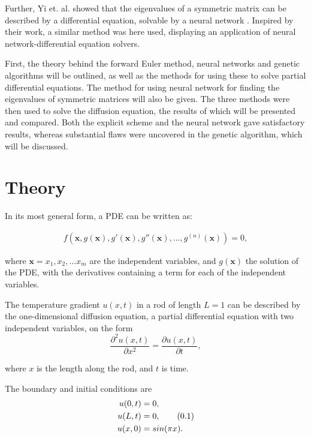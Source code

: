 \documentclass[multicolumn, 9pt]{extarticle}
\newcommand\numberthis{\addtocounter{equation}{1}\tag{\theequation}}
\begin{document}
Further, Yi et. al. showed that the eigenvalues of a symmetric matrix can be described by a differential equation, solvable by a neural network \cite{symmetric}. Inspired by their work, a similar method was here used, displaying an application of neural network-differential equation solvers.

First, the theory behind the forward Euler method, neural networks and genetic algorithms will be outlined, as well as the methods for using these to solve partial differential equations. The method for using neural network for finding the eigenvalues of symmetric matrices will also be given. The three methods were then used to solve the diffusion equation, the results of which will be presented and compared. Both the explicit scheme and the neural network gave satisfactory results, whereas substantial flaws were uncovered in the genetic algorithm, which will be discussed.


\section{Theory}
In its most general form, a PDE can be written as:

\begin{align}
	\label{eq:f-cost}
	f(\mathbf{x}, g(\mathbf{x}), g'(\mathbf{x}), g''(\mathbf{x}), \dots, g^{(n)}(\mathbf{x})) = 0,
\end{align}

where $\mathbf{x} = x_1, x_2, \dots x_m$ are the independent variables, and $g(\mathbf{x})$ the solution of the PDE, with the derivatives containing a term for each of the independent variables.

The temperature gradient $u(x, t)$ in a rod of length $L=1$ can be described by the one-dimensional diffusion equation, a partial differential equation with two independent variables, on the form
\begin{equation}\label{eq:diff}
	\frac{\partial^2 u(x, t) }{\partial x^2} = \frac{\partial u(x, t)}{\partial t},
\end{equation}

where $x$ is the length along the rod, and $t$ is time.

The boundary and initial conditions are
\begin{align*}\label{eq:boundary}
	u(0, t) & = 0,             \\
	u(L, t) & = 0, \numberthis \\
	u(x, 0) & = sin(\pi x).
\end{align*}
\end{document}
